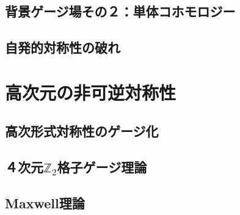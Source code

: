 \documentclass[report,paper=a4, fontsize=12pt, line_length=16cm, number_of_lines=33,dvipdfmx]{jlreq}
\numberwithin{equation}{chapter}
\newcommand{\Ztwo}{\mbox{$\mathbb{Z}_{2}$}}
\begin{document}
\section{背景ゲージ場その２：単体コホモロジー}
\section{自発的対称性の破れ}


\chapter{高次元の非可逆対称性}
\section{高次形式対称性のゲージ化}
\section{４次元\texorpdfstring{\Ztwo}{Z2}格子ゲージ理論}
\section{Maxwell理論}



\end{document}
